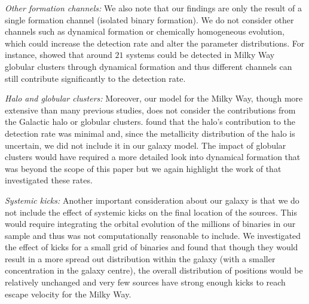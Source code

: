 \textit{Other formation channels:} We also note that our findings are only the result of a single formation channel (isolated binary formation). We do not consider other channels such as dynamical formation or chemically homogeneous evolution, which could increase the detection rate and alter the parameter distributions. For instance, \citet{Kremer+2018} showed that around $21$ systems could be detected in Milky Way globular clusters through dynamical formation and thus different channels can still contribute significantly to the detection rate.

\textit{Halo and globular clusters:} Moreover, our model for the Milky Way, though more extensive than many previous studies, does not consider the contributions from the Galactic halo or globular clusters. \citet{Lamberts+2018} found that the halo's contribution to the detection rate was minimal and, since the metallicity distribution of the halo is uncertain, we did not include it in our galaxy model. The impact of globular clusters would have required a more detailed look into dynamical formation that was beyond the scope of this paper but we again highlight the work of \citet{Kremer+2018} that investigated these rates.

\textit{Systemic kicks:} Another important consideration about our galaxy is that we do not include the effect of systemic kicks on the final location of the sources. This would require integrating the orbital evolution of the millions of binaries in our sample and thus was not computationally reasonable to include. We investigated the effect of kicks for a small grid of binaries and found that though they would result in a more spread out distribution within the galaxy (with a smaller concentration in the galaxy centre), the overall distribution of positions would be relatively unchanged and very few sources have strong enough kicks to reach escape velocity for the Milky Way.

